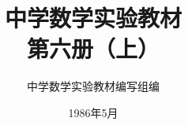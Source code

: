 \documentclass[b5paper, openany]{ctexbook}
\theoremstyle{plain}
\begin{document}














\title{\Huge\bfseries 中学数学实验教材\\第六册（上）}



\author{\Large 中学数学实验教材编写组编}
\date{\Large 1986年5月}

\maketitle




\frontmatter

% 
\tableofcontents


\mainmatter





% 



\backmatter


\end{document}
